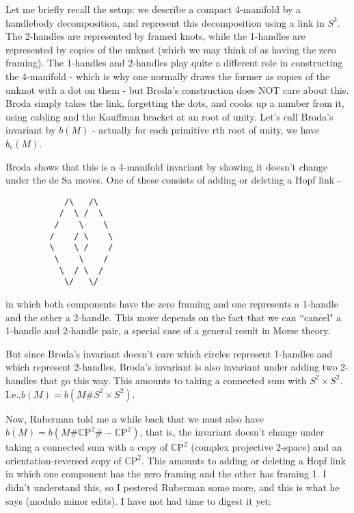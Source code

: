 
Let me briefly recall the setup: we describe a compact 4-manifold by a handlebody decomposition, and represent this decomposition using a link in $S^3$. The 2-handles are represented by framed knots, while the 1-handles are represented by copies of the unknot (which we may think of as having the zero framing). The 1-handles and 2-handles play quite a different role in constructing the 4-manifold - which is why one normally draws the former as copies of the unknot with a dot on them - but Broda's construction does NOT care about this. Broda simply takes the link, forgetting the dots, and cooks up a number from it, using cabling and the Kauffman bracket at an root of unity. Let's call Broda's invariant by $b(M)$ - actually for each primitive rth root of unity, we have $b_r(M)$.

Broda shows that this is a 4-manifold invariant by showing it doesn't change under the de Sa moves. One of these consists of adding or deleting a Hopf link -
\begin{verbatim}
            /\   /\
           /  \ /  \
          /    \    \       
         /    / \    \       
         \    \ /    /
          \    \    /
           \  / \  /
            \/   \/
\end{verbatim}


in which both components have the zero framing and one represents a 1-handle and the other a 2-handle. This move depends on the fact that we can ``cancel" a 1-handle and 2-handle pair, a special case of a general result in Morse theory.

But since Broda's invariant doesn't care which circles represent 1-handles and which represent 2-handles, Broda's invariant is also invariant under adding two 2-handles that go this way. This amounts to taking a connected sum with $S^2 \times S^2$. I.e.,$ b(M) = b(M \# S^2 \times S^2)$.

Now, Ruberman told me a while back that we must also have $b(M) = b(M \#  \mathbb{C}\mathrm{P}^2 \# - \mathbb{C}\mathrm{P}^2)$, that is, the invariant doesn't change under taking a connected sum with a copy of $ \mathbb{C}\mathrm{P}^2$ (complex projective 2-space) and an orientation-reversed copy of $ \mathbb{C}\mathrm{P}^2$. This amounts to adding or deleting a Hopf link in which one component has the zero framing and the other has framing 1. I didn't understand this, so I pestered Ruberman some more, and this is what he says (modulo minor edits). I have not had time to digest it yet:

